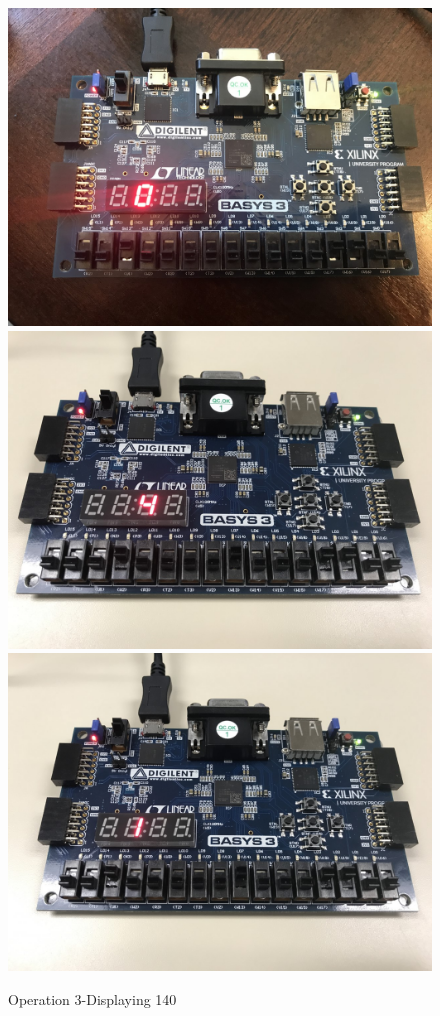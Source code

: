 \documentclass[11pt]{article}
\begin{document}
\begin{figure}[ht]\centering
	\includegraphics[angle=90, width=.6\textwidth]{op3_3.jpg}
	\includegraphics[angle=90, width=.6\textwidth]{op3_2.jpg}
	\includegraphics[angle=90, width=.6\textwidth]{op3_1.jpg}
	\caption{Operation 3-Displaying 140}
	\label{fig:sim_with_table}
\end{figure}
\clearpage
\end{document}
